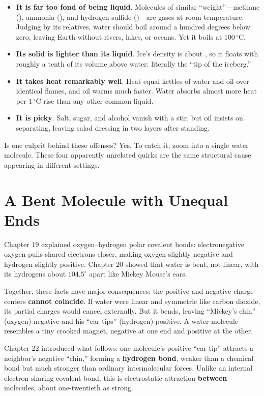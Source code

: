\begin{itemize}[itemsep=2pt]
\item \textbf{It is far too fond of being liquid}. Molecules of similar ``weight''---methane (), ammonia (), and hydrogen sulfide ()---are gases at room temperature. Judging by its relatives, water should boil around a hundred degrees below zero, leaving Earth without rivers, lakes, or oceans. Yet it boils at $100\,^{\circ}\mathrm{C}$.
\item \textbf{Its solid is lighter than its liquid}. Ice's density is about , so it floats with roughly a tenth of its volume above water: literally the ``tip of the iceberg.''
\item \textbf{It takes heat remarkably well}. Heat equal kettles of water and oil over identical flames, and oil warms much faster. Water absorbs almost more heat per $1\,^{\circ}\mathrm{C}$ rise than any other common liquid.
\item \textbf{It is picky}. Salt, sugar, and alcohol vanish with a stir, but oil insists on separating, leaving salad dressing in two layers after standing.
\end{itemize}

Is one culprit behind these offenses? Yes. To catch it, zoom into a single water molecule. These four apparently unrelated quirks are the same structural cause appearing in different settings.

\section{A Bent Molecule with Unequal Ends}

Chapter 19 explained oxygen--hydrogen polar covalent bonds: electronegative oxygen pulls shared electrons closer, making oxygen slightly negative and hydrogen slightly positive. Chapter 20 showed that water is bent, not linear, with its hydrogens about $104.5^{\circ}$ apart like Mickey Mouse's ears.

Together, these facts have major consequences: the positive and negative charge centers \textbf{cannot coincide}. If water were linear and symmetric like carbon dioxide, its partial charges would cancel externally. But it bends, leaving ``Mickey's chin'' (oxygen) negative and his ``ear tips'' (hydrogen) positive. A water molecule resembles a tiny crooked magnet, negative at one end and positive at the other.

Chapter 22 introduced what follows: one molecule's positive ``ear tip'' attracts a neighbor's negative ``chin,'' forming a \textbf{hydrogen bond}, weaker than a chemical bond but much stronger than ordinary intermolecular forces. Unlike an internal electron-sharing covalent bond, this is electrostatic attraction \textbf{between} molecules, about one-twentieth as strong.

